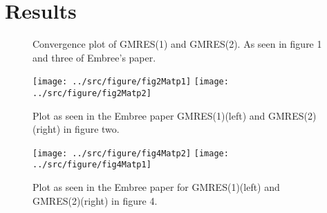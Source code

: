 \section{Results}

\begin{figure}


\caption{Convergence plot of GMRES(1) and GMRES(2). As seen in figure 1 and three of Embree's paper.}
\label{fig:ConvergenceFig1AndFig3}
\end{figure}

\begin{figure}
\centering
\texttt{[image: ../src/figure/fig2Matp1]}
\texttt{[image: ../src/figure/fig2Matp2]}
\caption{Plot as seen in the Embree paper GMRES(1)(left) and GMRES(2)(right) in figure two.}
\label{fig:fig2}
\end{figure}


\begin{figure}
\centering
\texttt{[image: ../src/figure/fig4Matp2]}
\texttt{[image: ../src/figure/fig4Matp1]}
\caption{Plot as seen in the Embree paper for GMRES(1)(left) and GMRES(2)(right) in figure 4.}
\label{fig:fig4}
\end{figure}

